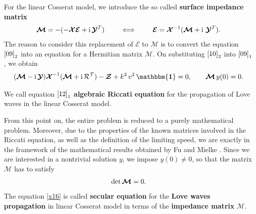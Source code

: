 \documentclass[10pt]{article}
\newcommand{\id}{{\mathbf{\mathbbm{1}}}}
\begin{document}
 For the linear Cosserat model,  we introduce the so called  \textbf{surface impedance matrix} 
 \begin{align}\label{10}
\boldsymbol{\boldsymbol{\mathcal{M}}}=-(-	\boldsymbol{\mathcal{X}}\boldsymbol{\mathcal{E}}+ {\rm i}\,\boldsymbol{\mathcal{Y}}^T)\qquad \iff \qquad \boldsymbol{\mathcal{E}}=\boldsymbol{\mathcal{X}}^{-1}(\boldsymbol{\mathcal{M}}+ {\rm i}\, \,\boldsymbol{\mathcal{Y}}^T).
 \end{align}
 The reason to consider  this replacement of $\boldsymbol{\mathcal{E}}$ to $\boldsymbol{\mathcal{M}}$ is to convert the equation $\eqref{09}_{2}$ into an  equation for a Hermitian matrix $\boldsymbol{\mathcal{M}}$. On substituting $\eqref{10}_2$ into $\eqref{09}_1$, we obtain
 \begin{align}\label{12}
 (\boldsymbol{\mathcal{M}}- {\rm i}\,\boldsymbol{\mathcal{Y}})\boldsymbol{\mathcal{X}}^{-1}(\boldsymbol{\mathcal{M}}+ {\rm i}\, \mathcal{R^T})-\boldsymbol{\mathcal{Z}}+k^2\, v^2\,{\id}=0, \qquad\boldsymbol{\boldsymbol{\mathcal{M}}}\, y(0)=0.
 \end{align}
 
  We call equation $\eqref{12}_1$  \textbf{algebraic Riccati equation} for the propagation of Love waves in  {the} linear Cosserat model.  
  
   From this point  {on}, the entire problem is reduced to a purely mathematical problem. Moreover, due to the properties of the known matrices involved in the Riccati equation, as well as the definition of the limiting speed, we are exactly in the framework of the mathematical results obtained by Fu and Mielke \cite{mielke2004uniqueness}. 
 Since we are interested in a nontrivial solution  $y$, we impose $y(0)
\neq0$, so that the matrix $\boldsymbol{\mathcal{M}}$ has to satisfy
 \begin{align}\label{x16}
 {\rm det}\,\boldsymbol{\mathcal{M}}=0.
 \end{align}
 	The  equation \eqref{x16} is called  \textbf{secular equation} for the {\bf Love waves propagation} in linear Cosserat model in terms of the \textbf{impedance matrix} $\boldsymbol{\mathcal{M}}$.
 
 
 
\end{document}
